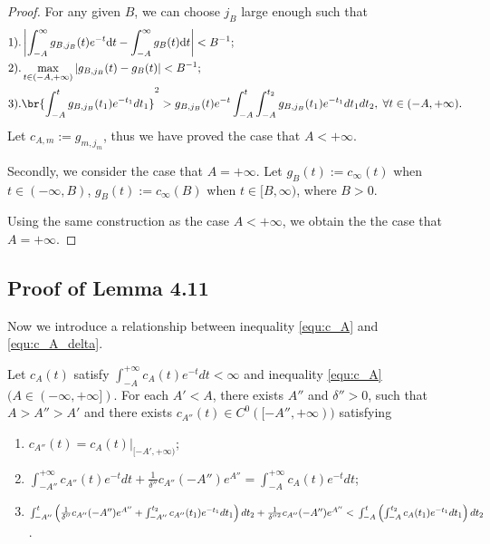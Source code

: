 \begin{proof}
  For any given $B$, we can choose $j_{B}$ large enough such that
\begin{equation}
\begin{split}
&1).\left|\int_{-A}^{\infty}g_{B,j_{B}}(t)e^{-t} \dd t-\int_{-A}^{\infty}g_{B}(t)\dd t \right|<B^{-1};
\\
&2).\max_{t\in(-A,+\infty)}|g_{B,j_{B}}(t)-g_{B}(t)|<B^{-1};
\\
&3).\br{\int_{-A}^{t}g_{B,j_{B}}(t_{1})e^{-t_{1}}dt_{1}}^{2}
>g_{B,j_{B}}(t)e^{-t}\int_{-A}^{t}
\int_{-A}^{t_{2}}g_{B,j_{B}}(t_{1})e^{-t_{1}}dt_{1}dt_{2},\; \forall t\in(-A,+\infty).
\end{split}
\end{equation}
Let $c_{A,m}:=g_{m,j_{m}}$, thus we have proved the case that
$A<+\infty$.

Secondly, we consider the case that $A=+\infty$. Let
$g_{B}(t):=c_{\infty}(t)$ when $t\in(-\infty,B)$,
$g_{B}(t):=c_{\infty}(B)$ when $t\in[B,\infty)$, where $B>0$.

Using the same construction as the case $A<+\infty$, we obtain the
the case that $A=+\infty$.
\end{proof}

\subsection{Proof of Lemma 4.11}

Now we introduce a relationship between inequality \ref{equ:c_A} and
\ref{equ:c_A_delta}.

\begin{lem}\label{l:relate_c_A_delta}
  Let $c_{A}(t)$ satisfy
$\int_{-A}^{+\infty}c_{A}(t)e^{-t}dt<\infty$ and inequality
\ref{equ:c_A} $(A\in(-\infty,+\infty])$. For each $A'<A$, there
exists $A''$ and $\delta''>0$, such that $A>A''>A'$ and there exists
$c_{A''}(t)\in C^{0}([-A'',+\infty))$ satisfying
\begin{enumerate}[label=\roman*)]
  \item $c_{A''}(t)=c_{A}(t)|_{[-A',+\infty)}$;
  \item $\int_{-A''}^{+\infty}c_{A''}(t)e^{-t}dt+\frac{1}{\delta''}c_{A''}(-A'')e^{A''}=
\int_{-A}^{+\infty}c_{A}(t)e^{-t}dt$;
\item $\int_{-A''}^{t}\left(\frac{1}{\delta''}c_{A''}(-A'')e^{A''}+\int_{-A''}^{t_{2}}c_{A''}(t_{1})e^{-t_{1}}dt_{1}\right)
dt_{2}+\frac{1}{{\delta''}^{2}}c_{A''}(-A'')e^{A''}<\\\int_{-A}^{t}\left(\int_{-A}^{t_{2}}c_{A}(t_{1})e^{-t_{1}}dt_{1}\right)
dt_{2}$.
\end{enumerate}
\end{lem}


